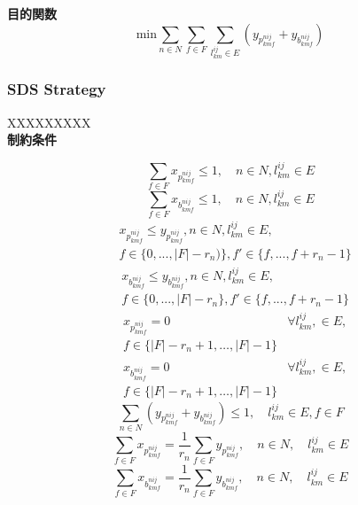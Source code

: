 \documentclass[a4j,twocolumn,fleqn]{jarticle}
\begin{document}
{\large \bf 目的関数}
\begin{equation}%
\mbox{min} \sum_{n \in N} \sum_{f \in F} \sum_{l^{ij}_{km} \in E}(y_{p^{nij}_{kmf}} + y_{b^{nij}_{kmf}})
\end{equation}

\subsubsection{SDS Strategy}
XXXXXXXXX\\
{\large \bf 制約条件}

\begin{equation}%
\sum_{f \in F}x_{p^{nij}_{kmf}} \leq 1,\quad n \in N, l^{ij}_{km} \in E
\end{equation}
\begin{equation}%
\sum_{f \in F}x_{b^{nij}_{kmf}} \leq 1,\quad n \in N, l^{ij}_{km}\in E
\end{equation}
\begin{eqnarray}%
&x_{p^{nij}_{kmf}} \leq y_{p^{nij}_{kmf}}, n \in N, l^{ij}_{km} \in E, \nonumber\\
&f \in \{0, ... , |F|-r_n)\},f' \in \{f, ... ,f +r_n -1\}
\end{eqnarray}
\begin{eqnarray}%
&x_{b^{nij}_{kmf}} \leq y_{b^{nij}_{kmf}}, n \in N, l^{ij}_{km} \in E, \nonumber \\
&f \in \{0, ... , |F|-r_n\},f' \in \{f, ... ,f + r_n -1\}
\end{eqnarray}
\begin{eqnarray}%
&x_{p^{nij}_{kmf}} = 0 & \forall l^{ij}_{km},\in E, \nonumber\\
&f \in \{|F| - r_n+1, \dots ,|F|-1\}
\end{eqnarray}
\begin{eqnarray}%
&x_{b^{nij}_{kmf}} = 0 & \forall l^{ij}_{km},\in E,\nonumber\\ 
&f \in \{|F| - r_n+1, \dots ,|F|-1\}
\end{eqnarray}
\begin{equation}%
\sum_{n \in N} (y_{p^{nij}_{kmf}} + y_{b^{nij}_{kmf}}) \leq 1,\quad l^{ij}_{km} \in E, f \in F
\end{equation}
\begin{equation}%
\sum_{f \in F}x_{p^{nij}_{kmf}} = \frac{1}{r_n}\sum_{f\in F}y_{p^{nij}_{kmf}},\quad n \in N,\quad l^{ij}_{km} \in E
\end{equation}
\begin{equation}%
\sum_{f \in F}x_{b^{nij}_{kmf}} = \frac{1}{r_n}\sum_{f\in F}y_{b^{nij}_{kmf}},\quad n \in N,\quad l^{ij}_{km} \in E
\end{equation}
\end{document}
